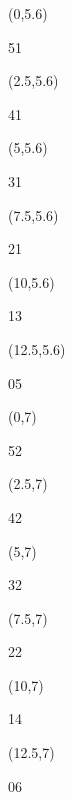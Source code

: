 \documentclass[a4paper]{article}
\newcommand{\myseat}[4]{%
	\vspace{0.1cm}
	\parbox[t][2.5cm][t]{3.5cm}{
	\small #1 %
	\begin{description}
	\vspace{-0.1cm}
	\item [ID:] #2
	\vspace{-0.1cm}
	\item [Team:] #3 \normalsize
	\vspace{-0.1cm}
	\item \normalsize #4
	\vspace{-0.1cm}
	\end{description}
	}
}
\begin{document}
\begin{textblock}{2.5}(0,5.6)
\textblockcolor{}
\myseat{51}{}{}{}
\end{textblock}

\begin{textblock}{2.5}(2.5,5.6)
\textblockcolor{}
\myseat{41}{}{}{}
\end{textblock}

\begin{textblock}{2.5}(5,5.6)
\textblockcolor{}
\myseat{31}{}{}{}
\end{textblock}

\begin{textblock}{2.5}(7.5,5.6)
\textblockcolor{}
\myseat{21}{}{}{}
\end{textblock}

\begin{textblock}{2.5}(10,5.6)
\textblockcolor{}
\myseat{13}{}{}{}
\end{textblock}

\begin{textblock}{2.5}(12.5,5.6)
\textblockcolor{}
\myseat{05}{}{}{}
\end{textblock}

\begin{textblock}{2.5}(0,7)
\textblockcolor{}
\myseat{52}{}{}{}
\end{textblock}

\begin{textblock}{2.5}(2.5,7)
\textblockcolor{}
\myseat{42}{}{}{}
\end{textblock}

\begin{textblock}{2.5}(5,7)
\textblockcolor{}
\myseat{32}{}{}{}
\end{textblock}

\begin{textblock}{2.5}(7.5,7)
\textblockcolor{}
\myseat{22}{}{}{}
\end{textblock}

\begin{textblock}{2.5}(10,7)
\textblockcolor{}
\myseat{14}{}{}{}
\end{textblock}

\begin{textblock}{2.5}(12.5,7)
\textblockcolor{}
\myseat{06}{}{}{}
\end{textblock}
\end{document}
